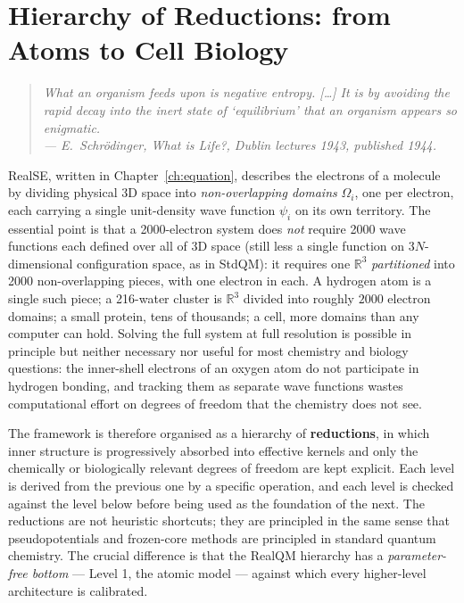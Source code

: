 \chapter{Hierarchy of Reductions: from Atoms to Cell Biology}\label{ch:hierarchy}

\begin{quote}
\itshape What an organism feeds upon is negative entropy. [\ldots] It is by avoiding the rapid decay into the inert state of `equilibrium' that an organism appears so enigmatic.\\
\normalfont\hfill --- E.~Schr\"odinger, \emph{What is Life?}, Dublin lectures 1943, published 1944.
\end{quote}
\bigskip

RealSE, written in Chapter~\ref{ch:equation}, describes the electrons of a molecule by dividing physical 3D space into \emph{non-overlapping domains} $\Omega_i$, one per electron, each carrying a single unit-density wave function $\psi_i$ on its own territory. The essential point is that a 2000-electron system does \emph{not} require 2000 wave functions each defined over all of 3D space (still less a single function on $3N$-dimensional configuration space, as in StdQM): it requires one $\mathbb{R}^3$ \emph{partitioned} into 2000 non-overlapping pieces, with one electron in each. A hydrogen atom is a single such piece; a 216-water cluster is $\mathbb{R}^3$ divided into roughly $2000$ electron domains; a small protein, tens of thousands; a cell, more domains than any computer can hold. Solving the full system at full resolution is possible in principle but neither necessary nor useful for most chemistry and biology questions: the inner-shell electrons of an oxygen atom do not participate in hydrogen bonding, and tracking them as separate wave functions wastes computational effort on degrees of freedom that the chemistry does not see.

The framework is therefore organised as a hierarchy of \textbf{reductions}, in which inner structure is progressively absorbed into effective kernels and only the chemically or biologically relevant degrees of freedom are kept explicit. Each level is derived from the previous one by a specific operation, and each level is checked against the level below before being used as the foundation of the next. The reductions are not heuristic shortcuts; they are principled in the same sense that pseudopotentials and frozen-core methods are principled in standard quantum chemistry. The crucial difference is that the RealQM hierarchy has a \emph{parameter-free bottom} --- Level 1, the atomic model --- against which every higher-level architecture is calibrated.

